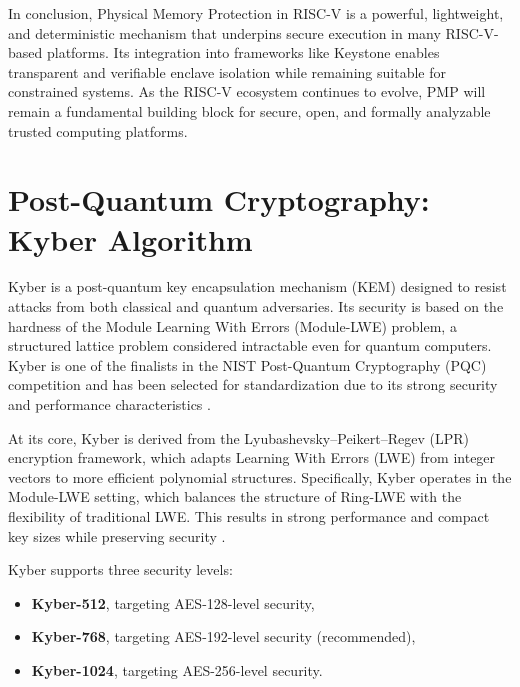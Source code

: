 In conclusion, Physical Memory Protection in RISC-V is a powerful, lightweight, and deterministic mechanism that underpins secure execution in many RISC-V-based platforms. Its integration into frameworks like Keystone enables transparent and verifiable enclave isolation while remaining suitable for constrained systems. As the RISC-V ecosystem continues to evolve, PMP will remain a fundamental building block for secure, open, and formally analyzable trusted computing platforms.

\section{Post-Quantum Cryptography: Kyber Algorithm}
\label{sec:kyber}

Kyber is a post-quantum key encapsulation mechanism (KEM) designed to resist attacks from both classical and quantum adversaries. Its security is based on the hardness of the Module Learning With Errors (Module-LWE) problem, a structured lattice problem considered intractable even for quantum computers. Kyber is one of the finalists in the NIST Post-Quantum Cryptography (PQC) competition and has been selected for standardization due to its strong security and performance characteristics \cite{kyber2024}.  %

At its core, Kyber is derived from the Lyubashevsky–Peikert–Regev (LPR) encryption framework, which adapts Learning With Errors (LWE) from integer vectors to more efficient polynomial structures. Specifically, Kyber operates in the Module-LWE setting, which balances the structure of Ring-LWE with the flexibility of traditional LWE. This results in strong performance and compact key sizes while preserving security \cite{kyber2024,kyber2021}. %

Kyber supports three security levels:
\begin{itemize}
    \item \textbf{Kyber-512}, targeting AES-128-level security,
    \item \textbf{Kyber-768}, targeting AES-192-level security (recommended),
    \item \textbf{Kyber-1024}, targeting AES-256-level security.
\end{itemize}

